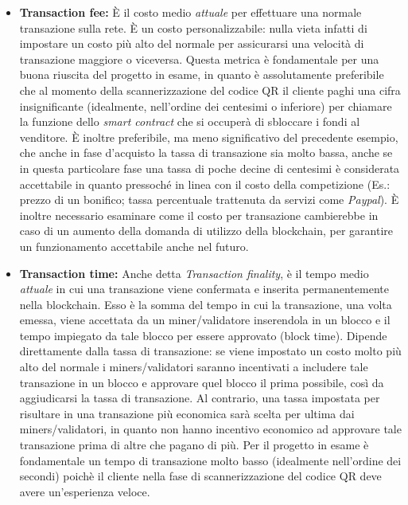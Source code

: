 \documentclass[a4paper, 12pt]{article}
\begin{document}
\begin{itemize}
\item \textbf{Transaction fee: }
È il costo medio \textit{attuale} per effettuare una normale transazione sulla rete.
È un costo personalizzabile: nulla vieta infatti di impostare un costo più alto del normale per assicurarsi una velocità di transazione maggiore o viceversa.
Questa metrica è fondamentale per una buona riuscita del progetto in esame, in quanto è assolutamente preferibile che al momento della scannerizzazione del codice QR
il cliente paghi una cifra insignificante (idealmente, nell'ordine dei centesimi o inferiore) per chiamare la funzione dello \textit{smart contract} che si occuperà di sbloccare i fondi
al venditore. È inoltre preferibile, ma meno significativo del precedente esempio, che anche in fase d'acquisto la tassa di transazione sia molto bassa, anche se
in questa particolare fase una tassa di poche decine di centesimi è considerata accettabile in quanto pressoché in linea con il costo della competizione (Es.: prezzo di un bonifico;
tassa percentuale trattenuta da servizi come \textit{Paypal}).
È inoltre necessario esaminare come il costo per transazione cambierebbe in caso di un aumento della domanda di utilizzo della blockchain, per garantire un funzionamento
accettabile anche nel futuro.\\

\item \textbf{Transaction time: }
Anche detta \textit{Transaction finality}, è il tempo medio \textit{attuale} in cui una transazione viene confermata e inserita permanentemente nella blockchain.
Esso è la somma del tempo in cui la transazione, una volta emessa, viene accettata da un miner/validatore inserendola in un blocco e il tempo impiegato da tale blocco per essere
approvato (block time). Dipende direttamente dalla tassa di transazione: se viene impostato un costo molto più alto del normale i miners/validatori saranno incentivati a includere tale transazione
in un blocco e approvare quel blocco il prima possibile, così da aggiudicarsi la tassa di transazione. Al contrario, una tassa impostata per risultare in una transazione più economica
sarà scelta per ultima dai miners/validatori, in quanto non hanno incentivo economico ad approvare tale transazione prima di altre che pagano di più.
Per il progetto in esame è fondamentale un tempo di transazione molto basso (idealmente nell'ordine dei secondi) poichè il cliente nella fase di scannerizzazione del codice QR deve
avere un'esperienza veloce.\\


\end{itemize}
\end{document}
